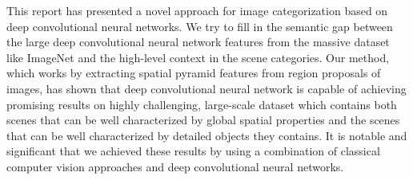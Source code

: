 
This report has presented a novel approach for image categorization based on
deep convolutional neural networks. We try to fill in the semantic gap between
the large deep convolutional neural network features from the massive dataset
like ImageNet and the high-level context in the scene categories. Our method, which
works by extracting spatial pyramid features from region proposals of images, has shown
that deep convolutional neural network is capable of achieving promising
results on highly challenging, large-scale dataset which contains both scenes
that can be well characterized by global spatial properties and the scenes that
can be well characterized by detailed objects they contains.
It is notable and significant that we achieved these results by using a
combination of classical computer vision approaches and deep convolutional
neural networks.